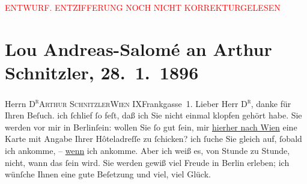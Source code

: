 
\begin{center}
            \textcolor{red}{ENTWURF. ENTZIFFERUNG NOCH NICHT KORREKTURGELESEN}
                      \end{center}
            
               \section[Lou Andreas-Salomé an Arthur Schnitzler, 28. 1. 1896]{ Lou Andreas-Salomé an Arthur Schnitzler, 28. 1. 1896}\nopagebreak{}\rehead{ }\begin{ledgroupsized}[t]{13cm}\normalsize\beginnumbering{} \toendnotes[C]{\smallbreak\pagebreak[2]} 
\toendnotes[C]{\smallbreak}\pstart{}{\pb}Herrn \textsc{D\textsuperscript{r}}\pend{}\pstart{}\textsc{Arthur Schnitzler}\pend{}\pstart{}\textsc{Wien IX}\pend{}\pstart{}Frankgasse 1.
                    \pend{}{\bigskip}\pstart
           \noindent{}{\pb}Lieber Herr \textsc{D\textsuperscript{r}}, danke für Ihren Beſuch. ich ſchlief ſo feſt, daß ich Sie
                    nicht einmal klopfen gehört habe. Sie werden vor mir in Berlinſein: wollen Sie ſo gut ſein, mir \uline{hierher nach Wien} eine Karte mit Angabe Ihrer Hôteladreſſe zu ſchicken? ich ſuche Sie gleich
                    auf, ſobald ich ankomme, – \uline{wenn} ich ankomme.
                    Aber ich weiß es, von Stunde zu Stunde, nicht, wann das ſein wird.\pend
           \pstart
           Sie werden gewiß viel Freude in Berlin
                    erleben; ich wünſche Ihnen eine gute Beſetzung und viel, viel Glück.\pend

\end{ledgroupsized}

